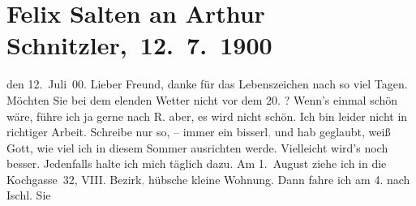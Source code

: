 

         
         \renewcommand{\erwaehntePersonen}{Personen: Paul Schlenther}
         \renewcommand{\erwaehnteInstitutionen}{Institutionen: Burgtheater}
         \renewcommand{\erwaehnteOrte}{Orte: Bad Ischl, Kochgasse, Reichenau an der Rax, Wien}
         \renewcommand{\erwaehnteWerke}{Werke: Der Schleier der Beatrice. Schauspiel in fünf Akten}
               \section[ Felix Salten an Arthur Schnitzler, 12. 7. 1900]{ Felix Salten an Arthur Schnitzler, 12. 7. 1900}\nopagebreak{}\rehead{ }\begin{ledgroupsized}[t]{13cm}\normalsize\beginnumbering \toendnotes[C]{\smallbreak\pagebreak[2]} 
\toendnotes[C]{\smallbreak}\pstart
           \raggedleft{}{\pb}den 12. Juli 00.\pend
           \pstart
           Lieber Freund, danke für das Lebenszeichen nach so viel Tagen.
               Möchten Sie bei dem elenden Wetter nicht vor dem 20.{ }\label{K_L03306-1v}\label{K_L03306-1h}? Wenn’s einmal
               schön wäre, führe ich ja gerne nach 
               R.
                 aber, es wird nicht schön. Ich
               bin leider nicht in richtiger Arbeit. Schreibe nur so, – immer ein
                  bisserl\textcolor{gray}{,} und hab geglaubt, weiß Gott, wie viel ich in diesem
               Sommer ausrichten werde. Vielleicht wird's noch besser. Jedenfalls halte ich mich
               täglich dazu. Am 1. August ziehe ich in die Kochgasse 32, VIII. Bezirk\textcolor{gray}{,} hübsche kleine Wohnung. Dann fahre ich am 4. nach Ischl. Sie

\end{ledgroupsized}
